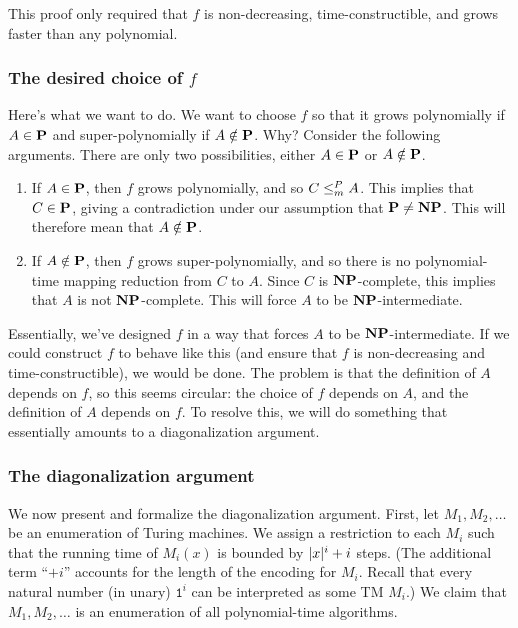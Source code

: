 \documentclass[11pt,twoside=off,numbers=noenddot]{scrbook}
\begin{document}
This proof only required that $f$ is non-decreasing, time-constructible, and grows faster than any polynomial.

\subsubsection{The desired choice of $f$}
Here's what we want to do. We want to choose $f$ so that it grows polynomially if $A \in \textbf{P}$ and super-polynomially if $A \notin \textbf{P}$. Why? Consider the following arguments. There are only two possibilities, either $A \in \textbf{P}$ or $A \notin \textbf{P}$.
\begin{enumerate}
  \item If $A \in \textbf{P}$, then $f$ grows polynomially, and so $C \leq_m^P A$. This implies that $C \in \textbf{P}$, giving a contradiction under our assumption that $\textbf{P} \neq \textbf{NP}$. This will therefore mean that $A \notin \textbf{P}$.
  \item If $A \notin \textbf{P}$, then $f$ grows super-polynomially, and so there is no polynomial-time mapping reduction from $C$ to $A$. Since $C$ is $\textbf{NP}$-complete, this implies that $A$ is not $\textbf{NP}$-complete. This will force $A$ to be $\textbf{NP}$-intermediate.
\end{enumerate}

Essentially, we've designed $f$ in a way that forces $A$ to be $\textbf{NP}$-intermediate. If we could construct $f$ to behave like this (and ensure that $f$ is non-decreasing and time-constructible), we would be done. The problem is that the definition of $A$ depends on $f$, so this seems circular: the choice of $f$ depends on $A$, and the definition of $A$ depends on $f$. To resolve this, we will do something that essentially amounts to a diagonalization argument.

\subsubsection{The diagonalization argument}
We now present and formalize the diagonalization argument. First, let $M_1, M_2, \dots$ be an enumeration of Turing machines. We assign a restriction to each $M_i$ such that the running time of $M_i(x)$ is bounded by $| x |^i + i$ steps. (The additional term ``$+ i$'' accounts for the length of the encoding for $M_i$. Recall that every natural number (in unary) $\texttt{1}^i$ can be interpreted as some TM $M_i$.) We claim that $M_1, M_2, \dots$ is an enumeration of all polynomial-time algorithms.
\end{document}
